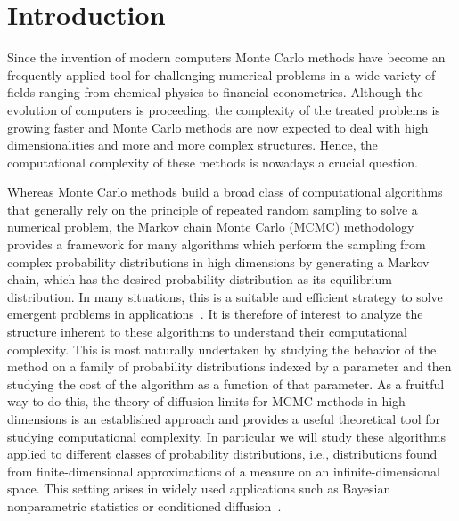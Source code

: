 \chapter{Introduction}
\label{sec:introduction}

Since the invention of modern computers Monte Carlo methods have become an frequently applied tool for challenging numerical problems in a wide variety of fields ranging from chemical physics to financial econometrics. Although the evolution of computers is proceeding, the complexity of the treated problems is growing faster and Monte Carlo methods are now expected to deal with high dimensionalities and more and more complex structures. Hence, the computational complexity of these methods is nowadays a crucial question.

Whereas Monte Carlo methods build a broad class of computational algorithms that generally rely on the principle of repeated random sampling to solve a numerical problem, the Markov chain Monte Carlo (MCMC) methodology~\autocite{Robert2005} provides a framework for many algorithms which perform the sampling from complex probability distributions in high dimensions by generating a Markov chain, which has the desired probability distribution as its equilibrium distribution. In many situations, this is a suitable and efficient strategy to solve emergent problems in applications~\autocite{Liu2004, Robert2005}. It is therefore of interest to analyze the structure inherent to these algorithms to understand their computational complexity. This is most naturally undertaken by studying the behavior of the method on a family of probability distributions indexed by a parameter and then studying the cost of the algorithm as a function of that parameter. As a fruitful way to do this, the theory of  diffusion limits for MCMC methods in high dimensions is an established approach and provides a useful theoretical tool for studying computational complexity. In particular we will study these algorithms applied to different classes of probability distributions, i.e., distributions found from finite-dimensional approximations of a measure on an infinite-dimensional space. This setting arises in widely used applications such as Bayesian nonparametric statistics or conditioned diffusion~\autocite{Beskos2008, Beskos2009, Dashti2012, Dashti2013, Delyon2006, Hairer2011, Stuart2010}.
\newline

